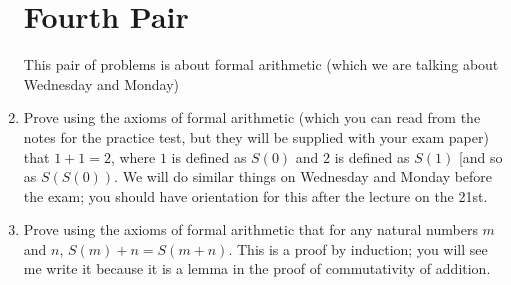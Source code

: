 \documentclass[12pt]{article}
\begin{document}
\begin{enumerate}
\section{Fourth Pair}

This pair of problems is about formal arithmetic (which we are talking about Wednesday and Monday)

\item  Prove using the axioms of formal arithmetic (which you can read from the notes for the practice test, but they will be supplied with your exam paper)
that $1+1 = 2$, where $1$ is defined as $S(0)$ and $2$ is defined as $S(1)$ [and so as $S(S(0))$.  We will do similar things on Wednesday and Monday before the exam; you should have orientation for this after the lecture on the 21st.

\newpage

\item   Prove using the axioms of formal arithmetic that for any natural numbers $m$ and $n$, $S(m)+n = S(m+n)$.  This is a proof by induction;  you will see me write it because it is a lemma in the proof of commutativity of addition.

\newpage


\end{enumerate}
\end{document}
